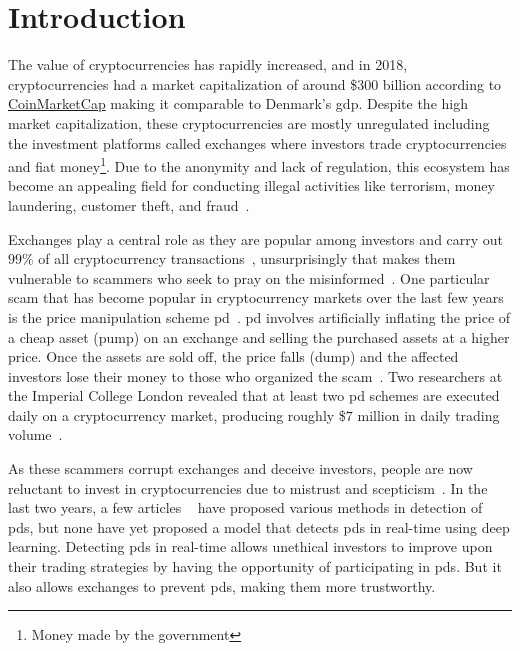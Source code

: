 
\chapter{Introduction}\label{ch:introduction}\glsresetall
The value of cryptocurrencies has rapidly increased, and in 2018, cryptocurrencies had a market capitalization of around \$$300$ billion according to \href{https://coinmarketcap.com/}{CoinMarketCap} making it comparable to Denmark's \ac{gdp}\cite{P&D_to_the_moon}. Despite the high market capitalization, these cryptocurrencies are mostly unregulated including the investment platforms called exchanges where investors trade cryptocurrencies and fiat money\footnote{Money made by the government\cite{fiat}}. Due to the anonymity and lack of regulation, this ecosystem has become an appealing field for conducting illegal activities like terrorism, money laundering, customer theft, and fraud~\cite{bitcoin_regulation}.

Exchanges play a central role as they are popular among investors and carry out $99\%$ of all cryptocurrency transactions~\cite{coinsutra}, unsurprisingly that makes them vulnerable to scammers who seek to pray on the misinformed~\cite{P&D_to_the_moon}. One particular scam that has become popular in cryptocurrency markets over the last few years is the price manipulation scheme \ac{pd}~\cite{P&D_anatomy}. \ac{pd} involves artificially inflating the price of a cheap asset (pump) on an exchange and selling the purchased assets at a higher price. Once the assets are sold off, the price falls (dump) and the affected investors lose their money to those who organized the scam~\cite{P&D_scheme}. Two researchers at the Imperial College London revealed that at least two \ac{pd} schemes are executed daily on a cryptocurrency market, producing roughly \$$7$ million in daily trading volume~\cite{P&D_anatomy}.

As these scammers corrupt exchanges and deceive investors, people are now reluctant to invest in cryptocurrencies due to mistrust and scepticism~\cite{anchor}. In the last two years, a few articles ~\cite{P&D_to_the_moon, P&D_anatomy, P&D_scheme, P&D_pumping} have proposed various methods in detection of \acp{pd}, but none have yet proposed a model that detects \acp{pd} in real-time using deep learning. Detecting \acp{pd} in real-time allows unethical investors to improve upon their trading strategies by having the opportunity of participating in \acp{pd}. But it also allows exchanges to prevent \acp{pd}, making them more trustworthy. 

